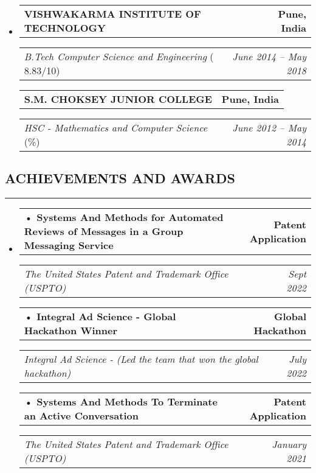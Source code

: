 \documentclass[a4paper]{article}
\makeatletter
\newcommand{\headerrow}[2]
{\begin{tabular*}{\linewidth}{l@{\extracolsep{\fill}}r}
#1 &
#2 \\
\end{tabular*}}
\makeatother
\begin{document}
\begin{itemize}[leftmargin=1em]
	\parskip=0.2em
	\item
	      \headerrow
	      {\textbf{VISHWAKARMA INSTITUTE OF TECHNOLOGY}}
	      {\textbf{Pune, India}}
	      \headerrow
	      {\emph{B.Tech Computer Science and Engineering} (\text{CPI:} 8.83/10)}
	      {\emph{June 2014 -- May 2018}}
	      \headerrow
	      {\textbf{S.M. CHOKSEY JUNIOR COLLEGE }}
	      {\textbf{Pune, India}}
	      \headerrow
	      {\emph{HSC - Mathematics and Computer Science} (\text 83.85\%)}
	      {\emph{June 2012 -- May 2014}}
	   
	      	      	      
\end{itemize}



\subsection*{\large ACHIEVEMENTS AND AWARDS}
\hrule
\vspace{1em}

\begin{itemize}[leftmargin=1em]
	\parskip=0.2em
			
	\item
	       \headerrow
	      {\textbf{• Systems And Methods for Automated Reviews of Messages in a Group Messaging Service}}
	      {\textbf{Patent Application}}
	      \headerrow
	      {\emph{The United States Patent and Trademark Office (USPTO)}}
	      {\emph{Sept 2022}}
	   
	       \headerrow
	      {\textbf{• Integral Ad Science - Global Hackathon Winner}}
	      {\textbf{ Global Hackathon}}
	      \headerrow
	      {\emph{Integral Ad Science - (Led the team that won the global hackathon)}}
	      {\emph{July 2022}}
	      
	      \headerrow
	      {\textbf{• Systems And Methods To Terminate an Active
Conversation}}
	      {\textbf{Patent Application}}
	      \headerrow
	      {\emph{The United States Patent and Trademark Office (USPTO)}}
	      {\emph{January 2021}}

	      
	      	      	      
\end{itemize}
\end{document}
